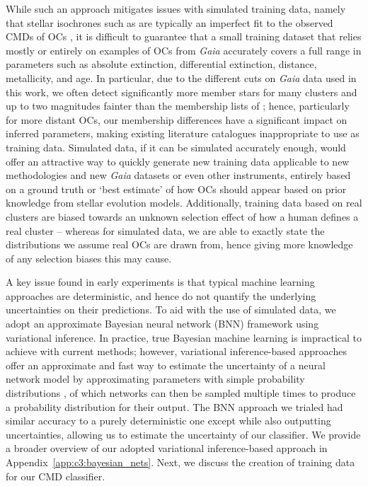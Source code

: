 While such an approach mitigates issues with simulated training data, namely that stellar isochrones such as \cite{bressan_parsec_2012} are typically an imperfect fit to the observed CMDs of OCs \citep{cantat-gaudin_painting_2020}, it is difficult to guarantee that a small training dataset that relies mostly or entirely on examples of OCs from \emph{Gaia} accurately covers a full range in parameters such as absolute extinction, differential extinction, distance, metallicity, and age. In particular, due to the different cuts on \emph{Gaia} data used in this work, we often detect significantly more member stars for many clusters and up to two magnitudes fainter than the membership lists of \cite{cantat-gaudin_clusters_2020}; hence, particularly for more distant OCs, our membership differences have a significant impact on inferred parameters, making existing literature catalogues inappropriate to use as training data. Simulated data, if it can be simulated accurately enough, would offer an attractive way to quickly generate new training data applicable to new methodologies and new \emph{Gaia} datasets or even other instruments, entirely based on a ground truth or `best estimate' of how OCs should appear based on prior knowledge from stellar evolution models. Additionally, training data based on real clusters are biased towards an unknown selection effect of how a human defines a real cluster -- whereas for simulated data, we are able to exactly state the distributions we assume real OCs are drawn from, hence giving more knowledge of any selection biases this may cause.

A key issue found in early experiments is that typical machine learning approaches are deterministic, and hence do not quantify the underlying uncertainties on their predictions. To aid with the use of simulated data, we adopt an approximate Bayesian neural network (BNN) framework using variational inference. In practice, true Bayesian machine learning is impractical to achieve with current methods; however, variational inference-based approaches offer an approximate and fast way to estimate the uncertainty of a neural network model by approximating parameters with simple probability distributions \citep{goan_bayesian_2020, jospin_hands-bayesian_2022}, of which networks can then be sampled multiple times to produce a probability distribution for their output. The BNN approach we trialed had similar accuracy to a purely deterministic one except while also outputting uncertainties, allowing us to estimate the uncertainty of our classifier. We provide a broader overview of our adopted variational inference-based approach in Appendix~\ref{app:c3:bayesian_nets}. Next, we discuss the creation of training data for our CMD classifier.


